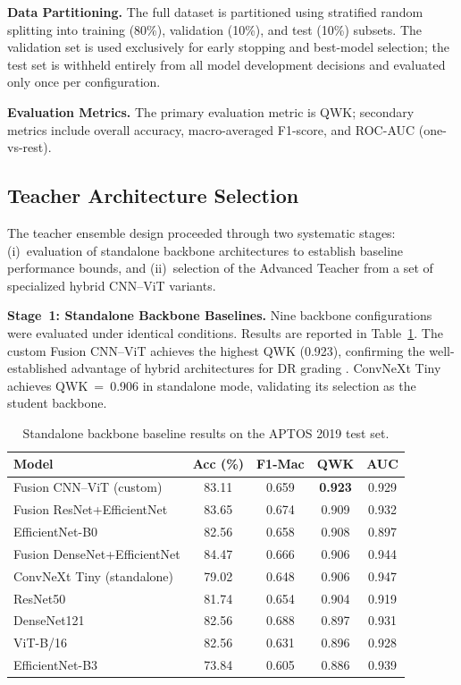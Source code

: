 \documentclass[a4paper,fleqn]{cas-dc}
\begin{document}
\textbf{Data Partitioning.} The full dataset is partitioned using stratified random splitting into training (80\%), validation (10\%), and test (10\%) subsets. The validation set is used exclusively for early stopping and best-model selection; the test set is withheld entirely from all model development decisions and evaluated only once per configuration.

\textbf{Evaluation Metrics.} The primary evaluation metric is QWK; secondary metrics include overall accuracy, macro-averaged F1-score, and ROC-AUC (one-vs-rest).

\subsection{Teacher Architecture Selection}
\label{sec:teacher_selection}

The teacher ensemble design proceeded through two systematic stages: (i)~evaluation of standalone backbone architectures to establish baseline performance bounds, and (ii)~selection of the Advanced Teacher from a set of specialized hybrid CNN--ViT variants.

\textbf{Stage~1: Standalone Backbone Baselines.} Nine backbone configurations were evaluated under identical conditions. Results are reported in Table~\ref{tab:backbones}. The custom Fusion CNN--ViT achieves the highest QWK (0.923), confirming the well-established advantage of hybrid architectures for DR grading \cite{zhang2025}. ConvNeXt Tiny achieves QWK~=~0.906 in standalone mode, validating its selection as the student backbone.

\begin{table}[t]
\centering
\caption{Standalone backbone baseline results on the APTOS 2019 test set.}
\label{tab:backbones}
\small
\begin{tabular}{lcccc}
\toprule
Model & Acc (\%) & F1-Mac & QWK & AUC \\
\midrule
Fusion CNN--ViT (custom) & 83.11 & 0.659 & \textbf{0.923} & 0.929 \\
Fusion ResNet+EfficientNet & 83.65 & 0.674 & 0.909 & 0.932 \\
EfficientNet-B0 & 82.56 & 0.658 & 0.908 & 0.897 \\
Fusion DenseNet+EfficientNet & 84.47 & 0.666 & 0.906 & 0.944 \\
ConvNeXt Tiny (standalone) & 79.02 & 0.648 & 0.906 & 0.947 \\
ResNet50 & 81.74 & 0.654 & 0.904 & 0.919 \\
DenseNet121 & 82.56 & 0.688 & 0.897 & 0.931 \\
ViT-B/16 & 82.56 & 0.631 & 0.896 & 0.928 \\
EfficientNet-B3 & 73.84 & 0.605 & 0.886 & 0.939 \\
\bottomrule
\end{tabular}
\end{table}
\end{document}
